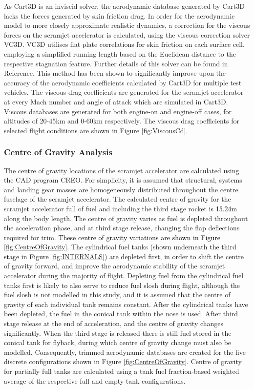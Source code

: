 		As Cart3D is an inviscid solver, the aerodynamic database generated by Cart3D lacks the forces generated by skin friction drag. In order for the aerodynamic model to more closely approximate realistic dynamics, a correction for the viscous forces on the scramjet accelerator is calculated, using the viscous correction solver VC3D\cite{Ward2018}. VC3D utilises flat plate correlations for skin friction on each surface cell, employing a simplified running length based on the Euclidean distance to the respective stagnation feature. Further details of this solver can be found in Reference\cite{Ward2018}. This method has been shown to significantly improve upon the accuracy of the aerodynamic coefficients calculated by Cart3D for multiple test vehicles\cite{Ward2018}. The viscous drag coefficients are generated for the scramjet accelerator at every Mach number and angle of attack which are simulated in Cart3D. Viscous databases are generated for both engine-on and engine-off cases, for altitudes of 20-45km and 0-60km respectively.  The viscous drag coefficients for selected flight conditions are shown in Figure \ref{fig:ViscousCd}.
		
		
		
		
		\subsubsection{Centre of Gravity Analysis}
		The centre of gravity locations of the scramjet accelerator are calculated using the CAD program CREO\cite{CREO}. For simplicity, it is assumed that structural, systems and landing gear masses are homogeneously distributed throughout the centre fuselage of the scramjet accelerator. 
		The calculated centre of gravity for the scramjet accelerator full of fuel and including the third stage rocket is \textcolor{black}{15.24m} along the body length. The centre of gravity varies as fuel is depleted throughout the acceleration phase, and at third stage release, changing the flap deflections required for trim. \textcolor{black}{These centre of gravity variations are shown in Figure \ref{fig:CentreOfGravity}}. The cylindrical fuel tanks \textcolor{black}{(shown underneath the third stage in Figure \ref{fig:INTERNALS})} are depleted first, in order to shift the centre of gravity forward, and improve the aerodynamic stability of the scramjet accelerator during the majority of flight. Depleting fuel from the cylindrical fuel tanks first is likely to also serve to reduce fuel slosh during flight, although the fuel slosh is not modelled in this study, and it is assumed that the centre of gravity of each individual tank remains constant. After the cylindrical tanks have been depleted, the fuel in the conical tank within the nose is used. After third stage release at the end of acceleration, and the centre of gravity changes significantly. When the third stage is released there is still fuel stored in the conical tank for flyback, during which centre of gravity change must also be modelled. 
		Consequently, trimmed aerodynamic databases are created for the five discrete configurations shown in Figure \ref{fig:CentreOfGravity}. Centre of gravity for partially full tanks are calculated using a tank fuel fraction-based weighted average of the respective full and empty tank configurations. 
		
